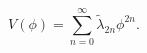 \begin{equation}
\label{eq:scalar_potential}
V(\phi)=\sum_{n=0}^\infty \tilde\lambda_{2n}\phi^{2n}.
\end{equation}

